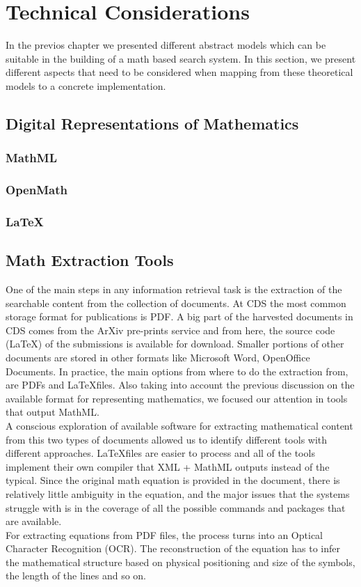 \chapter{Technical Considerations}
\label{chapter-technical_considerations}
In the previos chapter we presented different abstract models which can be suitable in the building of a math based search system.
In this section, we present different aspects that need to be considered when mapping from these theoretical models to a concrete implementation.

\section{Digital Representations of Mathematics}
\subsection{MathML}
\subsection{OpenMath}
\subsection{LaTeX}

\section{Math Extraction Tools}
One of the main steps in any information retrieval task is the extraction of the searchable content from the collection of documents. At CDS the most common storage format for publications is PDF. A big part of the harvested documents in CDS comes from the ArXiv pre-prints service and from here, the source code (\LaTeX) of the submissions is available for download. Smaller portions of other documents are stored in other formats like Microsoft Word, OpenOffice Documents.
In practice, the main options from where to do the extraction from, are PDFs and \LaTeX  files. Also taking into account the previous discussion on the available format for representing mathematics, we focused our attention in tools that output MathML.  \\
A conscious exploration of available software for extracting mathematical content from this two types of documents allowed us to identify different tools with different approaches. 
\LaTeX  files are easier to process and all of the tools implement their own compiler that XML + MathML outputs instead of the typical. Since the original math equation is provided in the document, there is relatively little ambiguity in the equation, and the major issues that the systems struggle with is in the coverage of all the possible commands and packages that are available. \\
For extracting equations from PDF files, the process turns into an Optical Character Recognition (OCR). The reconstruction of the equation has to infer the mathematical structure based on physical positioning and size of the symbols, the length of the lines and so on.

